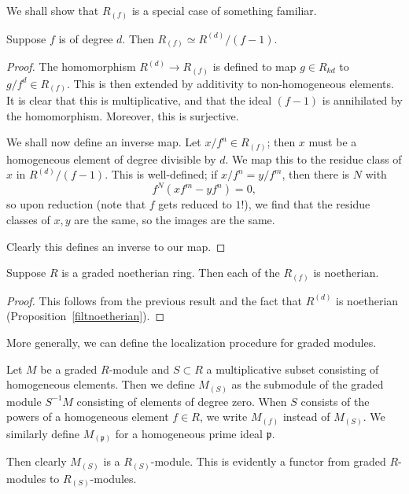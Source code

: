 We shall show that $R_{(f)}$ is a special case of something familiar.

\begin{proposition} \label{loc interpret as quotient ring}
Suppose $f$ is of degree $d$. Then $R_{(f)} \simeq R^{(d)}/(f-1)$.
\end{proposition} 
\begin{proof} 
The homomorphism $R^{(d)} \to R_{(f)}$ is defined to map $g \in R_{kd}$ to $g/f^d \in
R_{(f)}$.  This is then extended by additivity to non-homogeneous elements. It
is clear that this is multiplicative, and that the ideal $(f-1)$ is annihilated
by the homomorphism.
Moreover, this is surjective.

We shall now define an inverse map. Let $x/f^n \in R_{(f)}$; then $x$ must be
a homogeneous element of degree divisible by $d$. We map this to
the residue class of $x$ in $R^{(d)}/(f-1)$.  This is well-defined; if $x/f^n =
y/f^m$, then there is $N$ with
\[ f^N( xf^m - yf^n) = 0,  \]
so upon reduction (note that $f$ gets reduced to $1$!), we find that the
residue classes of $x,y$ are the same, so the images are the same.

Clearly this defines an inverse to our map.
\end{proof} 

\begin{corollary} 
Suppose $R$ is a graded noetherian ring. Then each of the $R_{(f)}$ is
noetherian.
\end{corollary} 
\begin{proof} 
This follows from the previous result and the fact that $R^{(d)}$ is noetherian
(Proposition~\ref{filtnoetherian}).\end{proof} 

More generally, we can define the localization procedure for graded modules.
\begin{definition} 
Let $M$ be a graded $R$-module and $S \subset R$ a multiplicative subset
consisting of homogeneous elements. Then we define $M_{(S)}$ as the submodule
of the graded module $S^{-1}M$ consisting of elements of degree zero. When $S$
consists of the powers of a homogeneous element $f \in R$, we write $M_{(f)}$
instead of $M_{(S)}$. We similarly define $M_{(\mathfrak{p})}$ for a
homogeneous prime ideal $\mathfrak{p}$.
\end{definition} 

Then clearly $M_{(S)}$ is a $R_{(S)}$-module. This is evidently a functor from
graded $R$-modules to $R_{(S)}$-modules.

